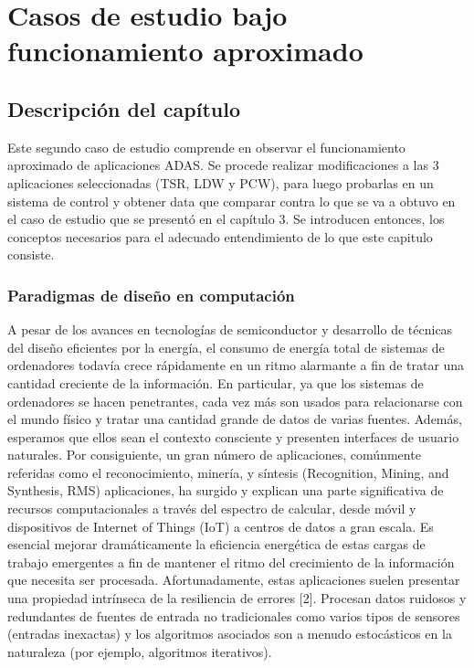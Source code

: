 \chapter{Casos de estudio bajo funcionamiento aproximado}
\label{ch:aproximado}

\section{Descripción del capítulo}

Este segundo caso de estudio comprende en observar el funcionamiento aproximado de aplicaciones ADAS. Se procede realizar modificaciones a las 3 aplicaciones seleccionadas (TSR, LDW y PCW), para luego probarlas en un sistema de control y obtener data que comparar contra lo que se va a obtuvo en el caso de estudio que se presentó en el capítulo 3. Se introducen entonces, los conceptos necesarios para el adecuado entendimiento de lo que este capitulo consiste. 

\subsection*{Paradigmas de diseño en computación}

A pesar de los avances en tecnologías de semiconductor y desarrollo de técnicas del diseño eficientes por la energía, el consumo de energía total de sistemas de ordenadores todavía crece rápidamente en un ritmo alarmante a fin de tratar una cantidad creciente de la información. En particular, ya que los sistemas de ordenadores se hacen penetrantes, cada vez más son usados para relacionarse con el mundo físico y tratar una cantidad grande de datos de varias fuentes. Además, esperamos que ellos sean el contexto consciente y presenten interfaces de usuario naturales. Por consiguiente, un gran número de aplicaciones, comúnmente referidas como el reconocimiento, minería, y síntesis (Recognition, Mining, and Synthesis, RMS) aplicaciones, ha surgido y explican una parte significativa de recursos computacionales a través del espectro de calcular, desde móvil y dispositivos de Internet of Things (IoT) a centros de datos a gran escala.
Es esencial mejorar dramáticamente la eficiencia energética de estas cargas de trabajo emergentes a fin de mantener el ritmo del crecimiento de la información que necesita ser procesada. Afortunadamente, estas aplicaciones suelen presentar una propiedad intrínseca de la resiliencia de errores [2]. Procesan datos ruidosos y redundantes de fuentes de entrada no tradicionales como varios tipos de sensores (entradas inexactas) y los algoritmos asociados son a menudo estocásticos en la naturaleza (por ejemplo, algoritmos iterativos)\cite{Xu2016}.




